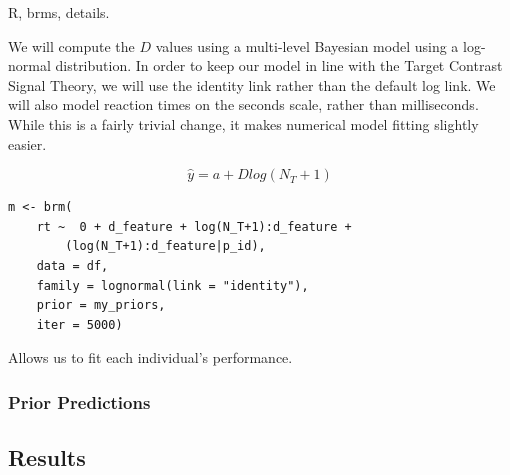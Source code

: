 \documentclass[smallextended]{svjour3}       %
\begin{document}
R, brms, details.

We will compute the $D$ values using a multi-level Bayesian model using a log-normal distribution. In order to keep our model in line with the Target Contrast Signal Theory, we will use the identity link rather than the default log link. We will also model reaction times on the seconds scale, rather than milliseconds. While this is a fairly trivial change, it makes numerical model fitting slightly easier. 

\begin{equation}
\hat{y} = a + Dlog(N_T + 1)
\label{eq:computeDlm}
\end{equation}

\begin{verbatim}
m <- brm(
    rt ~  0 + d_feature + log(N_T+1):d_feature + 
    	(log(N_T+1):d_feature|p_id),
    data = df,
    family = lognormal(link = "identity"),
    prior = my_priors,
    iter = 5000)
\end{verbatim}

Allows us to fit each individual's performance.

\subsubsection{Prior Predictions}

\subsection{Results}
\end{document}
